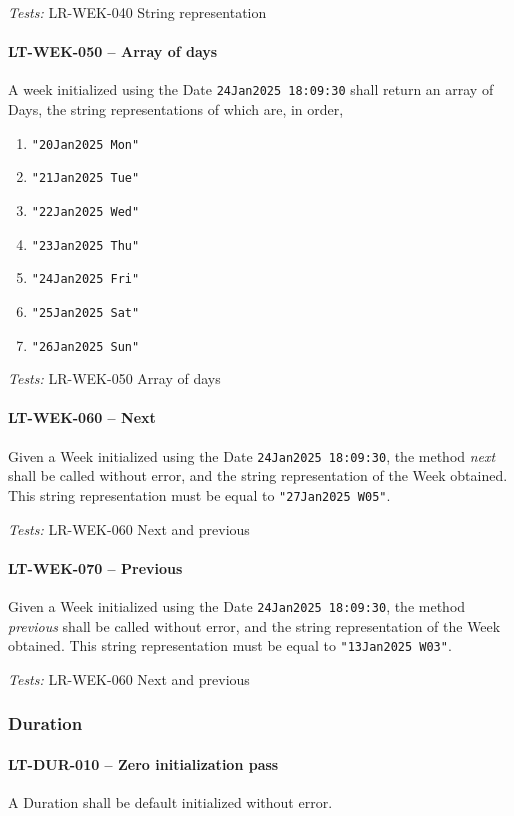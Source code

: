 \textit{Tests: } LR-WEK-040 String representation

\paragraph{LT-WEK-050 -- Array of days}
A week initialized using the Date \lstinline{24Jan2025 18:09:30} shall
return an array of Days, the string representations of which are,
in order,
\begin{enumerate}
\item \lstinline{"20Jan2025 Mon"}
\item \lstinline{"21Jan2025 Tue"}
\item \lstinline{"22Jan2025 Wed"}
\item \lstinline{"23Jan2025 Thu"}
\item \lstinline{"24Jan2025 Fri"}
\item \lstinline{"25Jan2025 Sat"}
\item \lstinline{"26Jan2025 Sun"}
\end{enumerate}

\textit{Tests: } LR-WEK-050 Array of days

\paragraph{LT-WEK-060 -- Next}
Given a Week initialized using the Date \lstinline{24Jan2025 18:09:30},
the method \emph{next} shall be called without error, and
the string representation of the Week obtained.
This string representation must be equal to \lstinline{"27Jan2025 W05"}.

\textit{Tests: } LR-WEK-060 Next and previous

\paragraph{LT-WEK-070 -- Previous}
Given a Week initialized using the Date \lstinline{24Jan2025 18:09:30},
the method \emph{previous} shall be called without error, and
the string representation of the Week obtained.
This string representation must be equal to \lstinline{"13Jan2025 W03"}.

\textit{Tests: } LR-WEK-060 Next and previous

\subsubsection{Duration}
\paragraph{LT-DUR-010 -- Zero initialization pass}
A Duration shall be default initialized without error.


